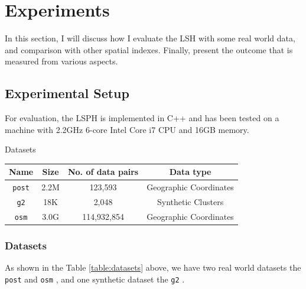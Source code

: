 \chapter{Experiments}
In this section, I will discuss how I evaluate the LSH with some real world data, and comparison with other spatial indexes. Finally, present the outcome that is measured from various aspects.

\section{Experimental Setup}

For evaluation, the LSPH is implemented in C++ and has been tested on a machine with 2.2GHz 6-core Intel Core i7 CPU and 16GB memory. 

\begin{center}
\begin{adjustbox}{max width={\textwidth}, max totalheight={\textheight},keepaspectratio}
\begin{threeparttable}
\caption{Datasets}

\begin{tabular}{c|c c c}
    \toprule
    \textbf{Name}    &\textbf{Size}  & \textbf{No. of data pairs} & \textbf{Data type}             \\ \midrule 
    \texttt{post}    & 2.2M & 123,593             &Geographic Coordinates \\
    \texttt{g2}      & 18K  & 2,048               & Synthetic Clusters    \\
    \texttt{osm}     & 3.0G & 114,932,854         &Geographic Coordinates \\
     \bottomrule
\end{tabular}
\end{threeparttable}
\label{table:datasets}
\end{adjustbox}
\end{center}

\subsection{Datasets} 
As shown in the Table \ref{table:datasets} above, we have two real world datasets the \texttt{post} \cite{rtreeportal} and \texttt{osm} \cite{OpenStreetMap}, and one synthetic dataset the \texttt{g2} \cite{G2sets}. 

